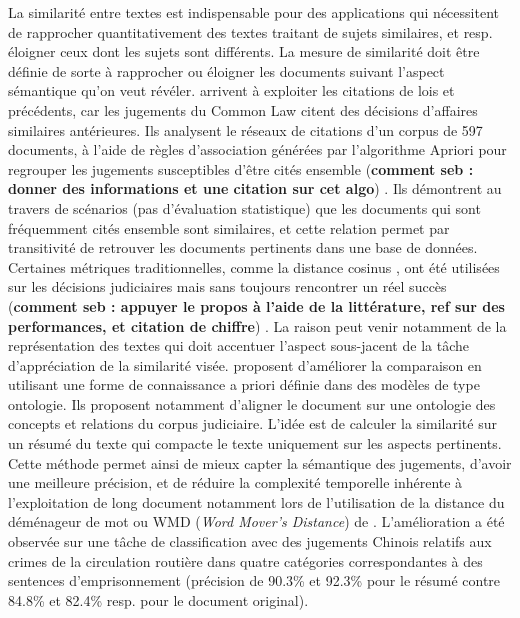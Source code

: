 La similarité entre textes est indispensable pour des applications qui nécessitent de rapprocher quantitativement des textes traitant de sujets similaires, et resp. éloigner ceux dont les sujets sont différents. La  mesure de similarité doit être définie de sorte à rapprocher ou éloigner les documents suivant l'aspect sémantique qu'on veut révéler. \citet{nair2018judgsimassorule} arrivent à exploiter les citations de lois et précédents, car les jugements du \og Common Law \fg{} citent des décisions d'affaires similaires antérieures. Ils analysent le réseaux de citations d'un corpus de 597 documents, à l'aide de règles d'association générées par l'algorithme Apriori pour regrouper les jugements susceptibles d'être cités ensemble (\textbf{comment seb : donner des informations et une citation sur cet algo}) . Ils démontrent au travers de scénarios (pas d'évaluation statistique) que les documents qui sont fréquemment cités ensemble sont similaires, et cette relation permet par transitivité de retrouver les documents pertinents dans une base de données. Certaines métriques traditionnelles, comme la distance cosinus \citep{thenmozhi2017legalprecedretriev}, ont été utilisées sur les décisions judiciaires mais sans toujours rencontrer un réel succès (\textbf{comment seb : appuyer le propos à l'aide de la littérature, ref sur des performances, et citation de chiffre}) . La raison peut venir notamment de la représentation des textes qui doit accentuer l'aspect sous-jacent de la tâche d'appréciation de la similarité visée. \citet{ma2018wmdchinesecase} proposent d'améliorer la comparaison en utilisant une forme de connaissance a priori définie dans des modèles de type ontologie. Ils proposent notamment d'aligner le document sur une ontologie des concepts et relations du corpus judiciaire. L'idée est de calculer la similarité sur un résumé du texte qui compacte le texte uniquement sur les aspects pertinents. Cette méthode permet ainsi de mieux capter la sémantique des jugements, d'avoir une meilleure précision, et de réduire la complexité temporelle inhérente à l'exploitation de long document notamment lors de l'utilisation de la \og distance du déménageur de mot \fg{} ou WMD (\textit{Word Mover's Distance}) de \citet{kusner2015wordmoverdist}. L'amélioration a été observée sur une tâche de classification avec des jugements Chinois relatifs aux crimes de la circulation routière dans quatre catégories correspondantes à des sentences d'emprisonnement (précision de 90.3\% et 92.3\% pour le résumé contre 84.8\% et 82.4\% resp. pour le document original). 

